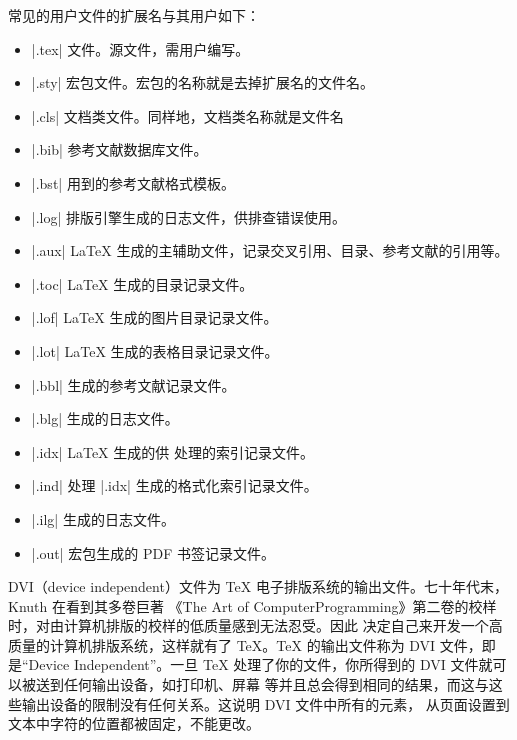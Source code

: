 


常见的用户文件的扩展名与其用户如下：
\begin{itemize}
  \item |.tex| 文件。源文件，需用户编写。
  \item |.sty| 宏包文件。宏包的名称就是去掉扩展名的文件名。
  \item |.cls| 文档类文件。同样地，文档类名称就是文件名
  \item |.bib| \BibTeX{} 参考文献数据库文件。
  \item |.bst| \BibTeX{} 用到的参考文献格式模板。
  \item |.log| 排版引擎生成的日志文件，供排查错误使用。
  \item |.aux| \LaTeX{} 生成的主辅助文件，记录交叉引用、目录、参考文献的引用等。
  \item |.toc| \LaTeX{} 生成的目录记录文件。
  \item |.lof| \LaTeX{} 生成的图片目录记录文件。
  \item |.lot| \LaTeX{} 生成的表格目录记录文件。
  \item |.bbl| \BibTeX{} 生成的参考文献记录文件。
  \item |.blg| \BibTeX{} 生成的日志文件。
  \item |.idx| \LaTeX{} 生成的供  处理的索引记录文件。
  \item |.ind|  处理 |.idx| 生成的格式化索引记录文件。
  \item |.ilg|  生成的日志文件。
  \item |.out|  宏包生成的 PDF 书签记录文件。
\end{itemize}



DVI（device independent）文件为 \TeX{} 电子排版系统的输出文件。七十年代末，Knuth 在看到其多卷巨著
《The Art of ComputerProgramming》第二卷的校样时，对由计算机排版的校样的低质量感到无法忍受。因此
决定自己来开发一个高质量的计算机排版系统，这样就有了 TeX。TeX 的输出文件称为 DVI 文件，即是“Device
Independent”。一旦 TeX 处理了你的文件，你所得到的 DVI 文件就可以被送到任何输出设备，如打印机、屏幕
等并且总会得到相同的结果，而这与这些输出设备的限制没有任何关系。这说明 DVI 文件中所有的元素，
从页面设置到文本中字符的位置都被固定，不能更改。


